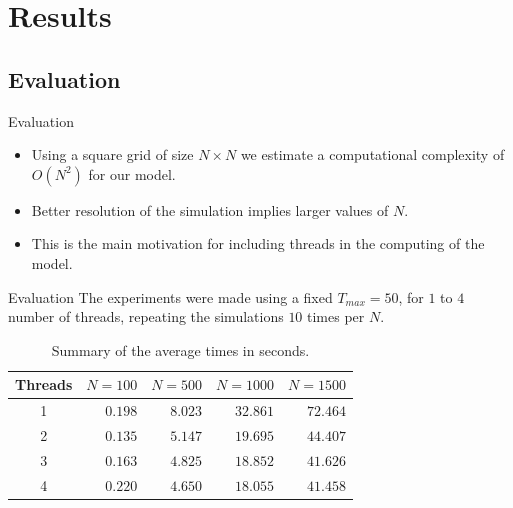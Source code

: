 \documentclass{beamer}
\begin{document}
  \section{Results}
      \subsection{Evaluation}
      
      \begin{frame}{Evaluation}
        \begin{itemize}
          \item<1-> Using a square grid of size $N \times N$ we estimate a computational complexity 
            of $O(N^2)$ for our model. 
          \item<2-> Better resolution of the simulation implies larger values of $N$.
          \item<3-> This is the main motivation for including threads in the computing of the model.
        \end{itemize} 
      \end{frame}
      
      \begin{frame}{Evaluation}
        The experiments were made using a fixed $T_{max}=50$, for $1$ to $4$ number of threads, repeating the 
        simulations $10$ times per $N$.
        \begin{table}[!ht]
          \renewcommand{\arraystretch}{1.3}
          \centering
          \caption{Summary of the average times in seconds.}
          \label{tab:results}
          \begin{tabular}{c||rrrr}
            \hline
            Threads & $N=100$ & $N=500$ & $N=1000$ & $N=1500$ \\ \hline\hline
            1       & $0.198$   & $8.023$   & $32.861$   & $72.464$   \\
            2       & $0.135$   & $5.147$   & $19.695$   & $44.407$   \\
            3       & $0.163$   & $4.825$   & $18.852$   & $41.626$   \\
            4       & $0.220$   & $4.650$   & $18.055$   & $41.458$  
          \end{tabular}
        \end{table}
      \end{frame}
      
\end{document}
